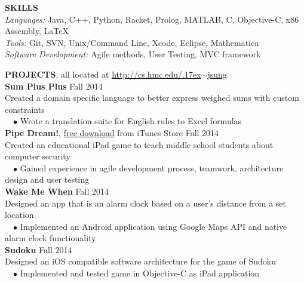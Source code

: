 \documentclass[11pt]{article}
\newcommand{\tildeText}{\raise.17ex\hbox{$\scriptstyle\sim$}}
\newcommand{\websitedisplaytext}{\small http://cs.hmc.edu/\tildeText jsung }
\newcommand{\website}{\href{http://cs.hmc.edu/~jsung}{\websitedisplaytext}}
\newcommand{\sectionNL}{\\[-2pt]}
\newcommand{\customtab}{$\hspace{10pt} \bullet \hspace{2pt}$}
\newcommand{\JudgeNudge}{\hspace{4pt}}
\newcommand{\rightAlign}{\hfill}
\begin{document}
\begin{flushleft}
{\textbf{SKILLS}} \sectionNL
\textit{Languages:} Java, C++, Python, Racket, Prolog, MATLAB, C, Objective-C, x86 Assembly, \LaTeX \\
\textit{Tools:} Git, SVN, Unix/Command Line, Xcode, Eclipse, Mathematica \\
\textit{Software Development:} Agile methods, User Testing, MVC framework
\end{flushleft}

\begin{flushleft}
{\textbf{PROJECTS}, all located at \website} \sectionNL
\textbf{Sum Plus Plus} \rightAlign Fall 2014 \\
\JudgeNudge Created a domain specific language to better express weighed sums with custom constraints \\
\customtab Wrote a translation suite for English rules to Excel formulas \\

\textbf{Pipe Dream!}, \href{https://itunes.apple.com/us/app/pipe-dream!/id947630499?mt=8}{free download} from iTunes Store \rightAlign Fall 2014 \\
\JudgeNudge Created an educational iPad game to teach middle school students about computer security\\
\customtab Gained experience in agile development process, teamwork, architecture design and user testing \\

\textbf{Wake Me When} \rightAlign Fall 2014 \\
\JudgeNudge Designed an app that is an alarm clock based on a user's distance from a set location \\
\customtab Implemented an Android application using Google Maps API and native alarm clock functionality \\
 
\textbf{Sudoku} \rightAlign Fall 2014 \\
\JudgeNudge Designed an iOS compatible software architecture for the game of Sudoku \\
\customtab Implemented and tested game in Objective-C as iPad application 


\end{flushleft}
\end{document}

